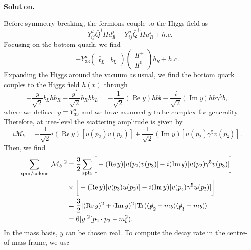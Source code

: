 \documentclass[a4paper,11pt]{article}
\DeclareMathOperator{\Tr}{Tr}
\newenvironment{solution}{\par\medskip\noindent\textbf{Solution.}\par\smallskip}{\par\medskip}
\begin{document}
\begin{solution}
Before symmetry breaking, the fermions couple to the Higgs field as
\begin{equation}
    -Y_{ij}^d\bar Q^iHd_R^j - Y_{ij}^u\bar Q^i \tilde{H}
 u_R^j + h.c.
\end{equation}
Focusing on the bottom quark, we find
\begin{equation}
    -Y_{33}^d
    \begin{pmatrix}
        \bar t_L& \bar b_L
    \end{pmatrix}
    \begin{pmatrix}
        H^+\\ H^0
    \end{pmatrix}b_R + h.c.
\end{equation}
Expanding the Higgs around the vacuum as usual, we find the bottom quark couples to the Higgs field $h(x)$ through
\begin{equation}
    -\frac{y}{\sqrt{2}}\bar b_L h b_R - \frac{y^*}{\sqrt{2}}\bar b_R h b_L = -\frac{1}{\sqrt{2}}(\operatorname{Re}y )h\bar b b -\frac{i}{\sqrt{2}} (\operatorname{Im}y)h \bar b \gamma^5 b,
\end{equation}
where we defined $y \equiv Y_{33}^d$ and we have assumed $y$ to be complex for generality.
Therefore, at tree-level the scattering amplitude is given by
\begin{equation}
    i\mathcal{M}_b = -\frac{1}{\sqrt{2}}i(\operatorname{Re}y )[\bar u(p_2)v(p_3)] + \frac{1}{\sqrt{2}}(\operatorname{Im}y)[\bar u(p_2)\gamma^5v(p_3)].
\end{equation}
Then, we find
\begin{equation}
\begin{aligned}
    \sum_\mathrm{spin/colour}|\mathcal{M}_b|^2 &= \frac{3}{2}\sum_\mathrm{spin}\bigg[-(\operatorname{Re}y )[\bar u(p_2)v(p_3)] -i (\operatorname{Im}y)[\bar u(p_2)\gamma^5v(p_3)]\bigg]\\
    &\times\bigg[-(\operatorname{Re}y )[\bar v(p_3)u(p_2)] -i (\operatorname{Im}y)[\bar v(p_3)\gamma^5u(p_2)]\bigg]\\
    &=\frac{3}{2}[(\operatorname{Re}y )^2 + (\operatorname{Im}y )^2]\Tr((\slashed{p}_2+m_b)(\slashed{p}_3 -m_b))\\
    &=6|y|^2(p_2\cdot p_3 - m_b^2).
\end{aligned}
\end{equation}
In the mass basis, $y$ can be chosen real.
To compute the decay rate in the centre-of-mass frame, we use
\begin{equation}

\end{equation}
\end{solution}
\end{document}
